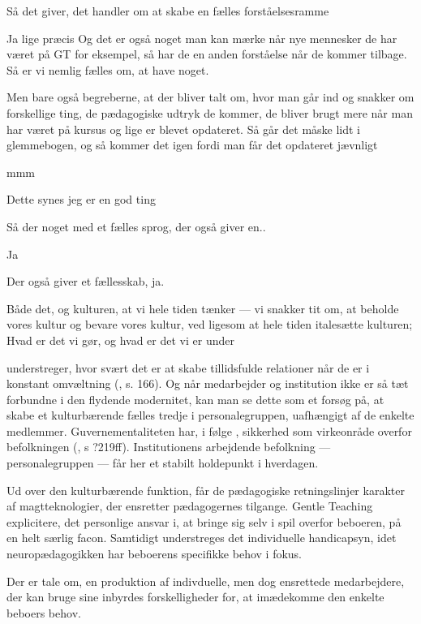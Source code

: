 \begin{description}
\MAA
Så det giver, det handler om at skabe en fælles forståelsesramme

\DMC
Ja lige præcis
Og det er også noget man kan mærke når nye mennesker de har været på GT for eksempel, så har de en anden forståelse når de kommer tilbage.
Så er vi nemlig fælles om, at have noget.

\AMB
Men bare også begreberne, at der bliver talt om, hvor man går ind og snakker om forskellige ting, de pædagogiske udtryk de kommer, de bliver brugt mere når man har været på kursus og lige er blevet opdateret.
Så går det måske lidt i glemmebogen, og så kommer det igen fordi man får det opdateret jævnligt

\DMC
mmm

\AMB
Dette synes jeg er en god ting

\MAA
Så der noget med et fælles sprog, der også giver en..

\AMB
Ja

\DMC
Der også giver et fællesskab, ja.

\AMB
Både det, og kulturen, at vi hele tiden tænker — vi snakker tit om, at beholde vores kultur og bevare vores kultur, ved ligesom at hele tiden italesætte kulturen;
Hvad er det vi gør, og hvad er det vi er under 
\end{description}

\citeauthor{baumanLiquidModernity2000} understreger, hvor svært det er at skabe tillidsfulde relationer når de er i konstant omvæltning (\citeyear{baumanLiquidModernity2000}, s. 166).
Og når medarbejder og institution ikke er så tæt forbundne i den flydende modernitet, kan man se dette som et forsøg på, at skabe et kulturbærende fælles tredje i personalegruppen,  uafhængigt af de enkelte medlemmer.
Guvernementaliteten har, i følge \citeauthor{foucaultGovernmentality2000}, sikkerhed som virkeonråde overfor befolkningen (\citeyear{foucaultGovernmentality2000}, s ?219ff).
Institutionens arbejdende befolkning — personalegruppen — får her et stabilt holdepunkt i hverdagen.

Ud over den kulturbærende funktion, får de pædagogiske retningslinjer karakter af magtteknologier, der ensretter pædagogernes tilgange.
Gentle Teaching explicitere, det personlige ansvar i, at bringe sig selv i spil overfor beboeren, på en helt særlig facon.
Samtidigt understreges det individuelle handicapsyn, idet neuropædagogikken har beboerens specifikke behov i fokus.

Der er tale om, en produktion af indivduelle, men dog ensrettede medarbejdere, der kan bruge sine inbyrdes forskelligheder for, at imædekomme den enkelte beboers behov.

